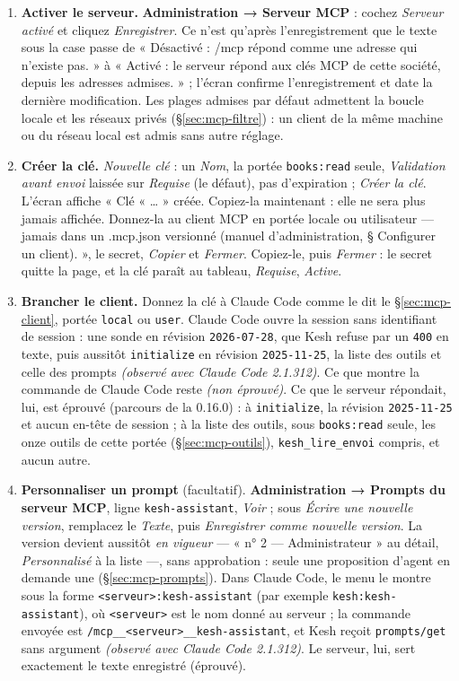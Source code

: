 \documentclass[a4paper,11pt,oneside]{article}
\begin{document}
\begin{enumerate}
    \item \textbf{Activer le serveur.} \textbf{Administration → Serveur MCP} : cochez \emph{Serveur activé} et cliquez \emph{Enregistrer}. Ce n'est qu'après l'enregistrement que le texte sous la case passe de « Désactivé : /mcp répond comme une adresse qui n'existe pas. » à « Activé : le serveur répond aux clés MCP de cette société, depuis les adresses admises. » ; l'écran confirme l'enregistrement et date la dernière modification. Les plages admises par défaut admettent la boucle locale et les réseaux privés (\S\ref{sec:mcp-filtre}) : un client de la même machine ou du réseau local est admis sans autre réglage.
    \item \textbf{Créer la clé.} \emph{Nouvelle clé} : un \emph{Nom}, la portée \texttt{books:read} seule, \emph{Validation avant envoi} laissée sur \emph{Requise} (le défaut), pas d'expiration ; \emph{Créer la clé}. L'écran affiche « Clé « \ldots{} » créée. Copiez-la maintenant : elle ne sera plus jamais affichée. Donnez-la au client MCP en portée locale ou utilisateur --- jamais dans un .mcp.json versionné (manuel d'administration, § Configurer un client). », le secret, \emph{Copier} et \emph{Fermer}. Copiez-le, puis \emph{Fermer} : le secret quitte la page, et la clé paraît au tableau, \emph{Requise}, \emph{Active}.
    \item \textbf{Brancher le client.} Donnez la clé à Claude Code comme le dit le \S\ref{sec:mcp-client}, portée \texttt{local} ou \texttt{user}. Claude Code ouvre la session sans identifiant de session : une sonde en révision \texttt{2026-07-28}, que Kesh refuse par un \texttt{400} en texte, puis aussitôt \texttt{initialize} en révision \texttt{2025-11-25}, la liste des outils et celle des prompts \emph{(observé avec Claude Code 2.1.312)}. Ce que montre la commande  de Claude Code reste \emph{(non éprouvé)}. Ce que le serveur répondait, lui, est éprouvé (parcours de la 0.16.0) : à \texttt{initialize}, la révision \texttt{2025-11-25} et aucun en-tête de session ; à la liste des outils, sous \texttt{books:read} seule, les onze outils de cette portée (\S\ref{sec:mcp-outils}), \texttt{kesh\_lire\_envoi} compris, et aucun autre.
    \item \textbf{Personnaliser un prompt} (facultatif). \textbf{Administration → Prompts du serveur MCP}, ligne \texttt{kesh-assistant}, \emph{Voir} ; sous \emph{Écrire une nouvelle version}, remplacez le \emph{Texte}, puis \emph{Enregistrer comme nouvelle version}. La version devient aussitôt \emph{en vigueur} --- « n° 2 --- Administrateur » au détail, \emph{Personnalisé} à la liste ---, sans approbation : seule une proposition d'agent en demande une (\S\ref{sec:mcp-prompts}). Dans Claude Code, le menu le montre sous la forme \texttt{<serveur>:kesh-assistant} (par exemple \texttt{kesh:kesh-assistant}), où \texttt{<serveur>} est le nom donné au serveur ; la commande envoyée est \texttt{/mcp\_\_<serveur>\_\_kesh-assistant}, et Kesh reçoit \texttt{prompts/get} sans argument \emph{(observé avec Claude Code 2.1.312)}. Le serveur, lui, sert exactement le texte enregistré (éprouvé).

\end{enumerate}
\end{document}
